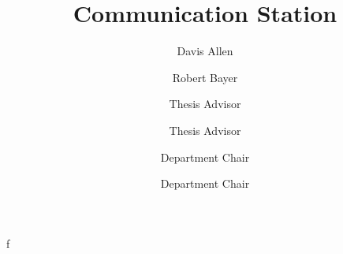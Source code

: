 \documentclass{scu-thesis}
\author{Davis Allen}
\author{Robert Bayer}
\title{Communication Station}
\begin{document}
\frontmatter
\signature{Thesis Advisor}
\signature{Thesis Advisor}f
\signature{Department Chair}
\signature{Department Chair}

\maketitle


\tableofcontents
\listoffigures

\mainmatter
















\backmatter
\end{document}
